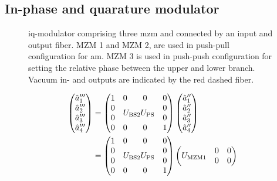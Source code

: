 \subsection{In-phase and quarature modulator}

\begin{figure}[htb]
	\centering
	
	\caption{\gls{iq}-modulator comprising three \gls{mzm} and connected by an input and output fiber. MZM 1 and MZM 2, are used in push-pull configuration for \gls{am}. MZM 3 is used in push-push configuration for setting the relative phase between the upper and lower branch. Vacuum in- and outputs are indicated by the red dashed fiber.}
\end{figure}

\begin{equation}
	\begin{split}
		\begin{pmatrix}
			\hat{a}_1^{\prime\prime\prime} \\
			\hat{a}_2^{\prime\prime\prime} \\
			\hat{a}_3^{\prime\prime\prime} \\
			\hat{a}_4^{\prime\prime\prime}
		\end{pmatrix}
		&=
		\begin{pmatrix}
			 1 & 0 & 0 & 0 \\
			 0 & \multicolumn{2}{c}{\multirow{2}{*}{$U_\text{BS2}U_\text{PS}$}} & 0 \\
			 0 & & & 0 \\
			 0 & 0 & 0 & 1
		\end{pmatrix}
		\begin{pmatrix}
			\hat{a}_1^{\prime\prime} \\
			\hat{a}_2^{\prime\prime} \\
			\hat{a}_3^{\prime\prime} \\
			\hat{a}_4^{\prime\prime}
		\end{pmatrix}
		\\
		&=
		\begin{pmatrix}
			 1 & 0 & 0 & 0 \\
			 0 & \multicolumn{2}{c}{\multirow{2}{*}{$U_\text{BS2}U_\text{PS}$}} & 0 \\
			 0 & & & 0 \\
			 0 & 0 & 0 & 1
		\end{pmatrix}
		\begin{pmatrix}
			 \multicolumn{2}{c}{\multirow{2}{*}{$U_\text{MZM1}$}} & 0 & 0 \\
			 & & 0 & 0 \\

\end{pmatrix}
\end{split}
\end{equation}
